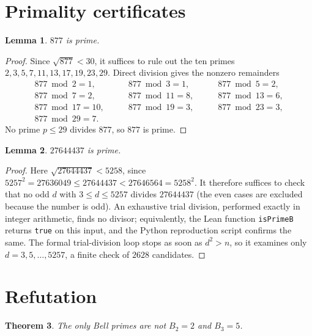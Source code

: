\documentclass[11pt]{article}
\newtheorem{theorem}{Theorem}
\newtheorem{lemma}[theorem]{Lemma}
\theoremstyle{definition}
\begin{document}
\section{Primality certificates}

\begin{lemma}
$877$ is prime.
\end{lemma}

\begin{proof}
Since $\sqrt{877} < 30$, it suffices to rule out the ten primes
$2,3,5,7,11,13,17,19,23,29$. Direct division gives the nonzero remainders
\[
\begin{aligned}
877 \bmod 2 = 1, &\qquad
877 \bmod 3 = 1, &\qquad
877 \bmod 5 = 2,\\
877 \bmod 7 = 2, &\qquad
877 \bmod 11 = 8, &\qquad
877 \bmod 13 = 6,\\
877 \bmod 17 = 10, &\qquad
877 \bmod 19 = 3, &\qquad
877 \bmod 23 = 3,\\
877 \bmod 29 = 7. &&
\end{aligned}
\]
No prime $p \le 29$ divides $877$, so $877$ is prime.
\end{proof}

\begin{lemma}
$27644437$ is prime.
\end{lemma}

\begin{proof}
Here $\sqrt{27644437} < 5258$, since $5257^2 = 27636049 \le 27644437 <
27646564 = 5258^2$.  It therefore suffices to check that no odd
$d$ with $3 \le d \le 5257$ divides $27644437$ (the even cases are excluded
because the number is odd).  An exhaustive trial division, performed exactly
in integer arithmetic, finds no divisor; equivalently, the Lean function
\texttt{isPrimeB} returns \texttt{true} on this input, and the Python
reproduction script confirms the same.  The formal trial-division loop stops
as soon as $d^2 > n$, so it examines only $d = 3, 5, \dots, 5257$, a finite
check of $2628$ candidates.
\end{proof}

\section{Refutation}

\begin{theorem}
The only Bell primes are not $B_2 = 2$ and $B_3 = 5$.
\end{theorem}
\end{document}
